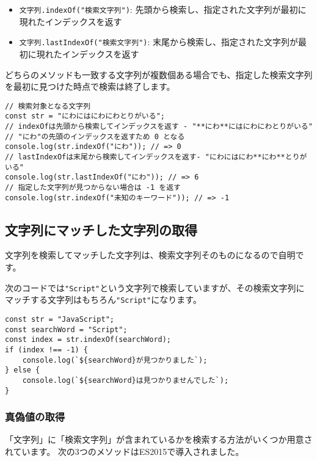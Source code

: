 \begin{itemize}
\item
  \texttt{文字列.indexOf("検索文字列")}:
  先頭から検索し、指定された文字列が最初に現れたインデックスを返す
\item
  \texttt{文字列.lastIndexOf("検索文字列")}:
  末尾から検索し、指定された文字列が最初に現れたインデックスを返す
\end{itemize}

どちらのメソッドも一致する文字列が複数個ある場合でも、指定した検索文字列を最初に見つけた時点で検索は終了します。

\begin{lstlisting}
// 検索対象となる文字列
const str = "にわにはにわにわとりがいる";
// indexOfは先頭から検索してインデックスを返す - "**にわ**にはにわにわとりがいる"
// "にわ"の先頭のインデックスを返すため 0 となる
console.log(str.indexOf("にわ")); // => 0
// lastIndexOfは末尾から検索してインデックスを返す- "にわにはにわ**にわ**とりがいる"
console.log(str.lastIndexOf("にわ")); // => 6
// 指定した文字列が見つからない場合は -1 を返す
console.log(str.indexOf("未知のキーワード")); // => -1
\end{lstlisting}

\hypertarget{match-by-string}{%
\subsection{文字列にマッチした文字列の取得}\label{match-by-string}}

文字列を検索してマッチした文字列は、検索文字列そのものになるので自明です。

次のコードでは\texttt{"Script"}という文字列で検索していますが、その検索文字列にマッチする文字列はもちろん\texttt{"Script"}になります。

\begin{lstlisting}
const str = "JavaScript";
const searchWord = "Script";
const index = str.indexOf(searchWord);
if (index !== -1) {
    console.log(`${searchWord}が見つかりました`);
} else {
    console.log(`${searchWord}は見つかりませんでした`);
}
\end{lstlisting}

\hypertarget{test-by-string}{%
\subsubsection{真偽値の取得}\label{test-by-string}}

「文字列」に「検索文字列」が含まれているかを検索する方法がいくつか用意されています。
次の3つのメソッドはES2015で導入されました。

